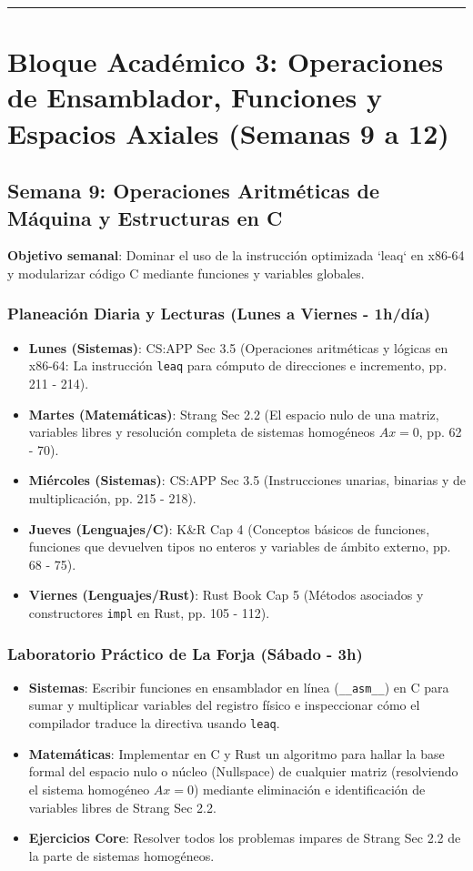 \documentclass[11pt, a4paper]{article}
\begin{document}
\noindent\rule{\textwidth}{0.4pt}
\newpage

\section{Bloque Académico 3: Operaciones de Ensamblador, Funciones y Espacios Axiales (Semanas 9 a 12)}

\subsection{Semana 9: Operaciones Aritméticas de Máquina y Estructuras en C}
\textbf{Objetivo semanal}: Dominar el uso de la instrucción optimizada `leaq` en x86-64 y modularizar código C mediante funciones y variables globales.

\subsubsection{Planeación Diaria y Lecturas (Lunes a Viernes - 1h/día)}
\begin{itemize}
    \item \textbf{Lunes (Sistemas)}: CS:APP Sec 3.5 (Operaciones aritméticas y lógicas en x86-64: La instrucción \texttt{leaq} para cómputo de direcciones e incremento, pp. 211 - 214).
    \item \textbf{Martes (Matemáticas)}: Strang Sec 2.2 (El espacio nulo de una matriz, variables libres y resolución completa de sistemas homogéneos $Ax = 0$, pp. 62 - 70).
    \item \textbf{Miércoles (Sistemas)}: CS:APP Sec 3.5 (Instrucciones unarias, binarias y de multiplicación, pp. 215 - 218).
    \item \textbf{Jueves (Lenguajes/C)}: K\&R Cap 4 (Conceptos básicos de funciones, funciones que devuelven tipos no enteros y variables de ámbito externo, pp. 68 - 75).
    \item \textbf{Viernes (Lenguajes/Rust)}: Rust Book Cap 5 (Métodos asociados y constructores \texttt{impl} en Rust, pp. 105 - 112).
\end{itemize}

\subsubsection{Laboratorio Práctico de La Forja (Sábado - 3h)}
\begin{itemize}
    \item \textbf{Sistemas}: Escribir funciones en ensamblador en línea (\texttt{\_\_asm\_\_}) en C para sumar y multiplicar variables del registro físico e inspeccionar cómo el compilador traduce la directiva usando \texttt{leaq}.
    \item \textbf{Matemáticas}: Implementar en C y Rust un algoritmo para hallar la base formal del espacio nulo o núcleo (Nullspace) de cualquier matriz (resolviendo el sistema homogéneo $Ax = 0$) mediante eliminación e identificación de variables libres de Strang Sec 2.2.
    \item \textbf{Ejercicios Core}: Resolver todos los problemas impares de Strang Sec 2.2 de la parte de sistemas homogéneos.
\end{itemize}
\end{document}
